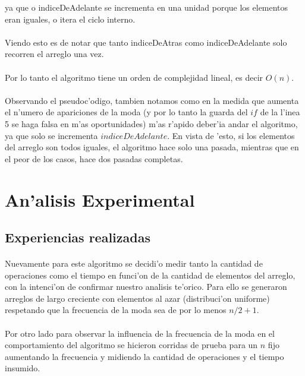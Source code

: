 ya que o indiceDeAdelante se incrementa en una unidad porque los elementos eran iguales, o itera el ciclo interno.\\

\paragraph{}
Viendo esto es de notar que tanto indiceDeAtras como indiceDeAdelante solo recorren el arreglo una vez. 
\paragraph{}
Por lo tanto el algoritmo tiene un orden de complejidad lineal, es decir $O(n)$.
\paragraph{}
Observando el pseudoc'odigo, tambien notamos como en la medida que aumenta el n'umero de apariciones de la 
moda (y por lo tanto la guarda del $if$ de la l'inea 5 se haga falsa en m'as oportunidades) m'as r'apido 
deber'ia andar el algoritmo, ya que solo se incrementa $indiceDeAdelante$. En vista de 'esto, si los elementos 
del arreglo son todos iguales, el algoritmo hace solo una pasada, mientras que en el peor de los casos, 
hace dos pasadas completas.

\section{An'alisis Experimental}
\subsection{Experiencias realizadas}
\paragraph{}
Nuevamente para este algoritmo se decidi'o medir tanto la cantidad de operaciones como el tiempo en funci'on de la cantidad de 
elementos del arreglo, con la intenci'on de confirmar nuestro analisis te'orico. Para ello se generaron arreglos de largo creciente 
con elementos al azar (distribuci'on uniforme) respetando que la frecuencia de la moda sea de por lo menos $n/2+1$.
\paragraph{}
Por otro lado para observar la influencia de la frecuencia de la moda en el comportamiento del algoritmo se hicieron corridas de prueba
para un $n$ fijo aumentando la frecuencia y midiendo la cantidad de operaciones y el tiempo insumido.
